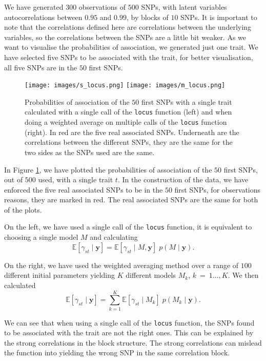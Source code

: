 \documentclass[a4paper, 11pt]{report}
\numberwithin{equation}{chapter}
\begin{document}
We have generated $300$ observations of $500$ SNPs, with latent variables autocorrelations between $0.95$ and $0.99$, by blocks of $10$ SNPs. It is important to note that the correlations defined here are correlations between the underlying variables, so the correlations between the SNPs are a little bit weaker. As we want to visualise the probabilities of association, we generated just one trait. We have selected five SNPs to be associated with the trait, for better visualisation, all five SNPs are in the $50$ first SNPs.


\begin{figure}[h]
\texttt{[image: images/s\_locus.png]}
\texttt{[image: images/m\_locus.png]}
\caption{\label{fig:simple_locus}Probabilities of association of the $50$ first SNPs with a single trait calculated with a single call of the \texttt{locus} function (left) and when doing a weighted average on multiple calls of the \texttt{locus} function (right). In red are the five real associated SNPs. Underneath are the correlations between the different SNPs, they are the same for the two sides as the SNPs used are the same.}
\end{figure}

In Figure \ref{fig:simple_locus}, we have plotted the probabilities of association of the $50$ first SNPs, out of $500$ used, with a single trait $t$. In the construction of the data, we have enforced the five real associated SNPs to be in the $50$ first SNPs, for observations reasons, they are marked in red. The real associated SNPs are the same for both of the plots.

On the left, we have used a single call of the \texttt{locus} function, it is equivalent to choosing a single model $M$ and calculating
\begin{equation*}
\mathbb{E}\left[\gamma_{st}\mid\boldsymbol{y}\right] = \mathbb{E}\left[\gamma_{st}\mid M,\boldsymbol{y}\right]\;p\left(M\mid\boldsymbol{y}\right).
\end{equation*}

On the right, we have used the weighted averaging method over a range of $100$ different initial parameters yielding $K$ different models $ M_k$, $k~=~1\ldots,K$. We then calculated
\begin{equation*}
\mathbb{E}\left[\gamma_{st}\mid\boldsymbol{y}\right] = \sum_{k=1}^K\mathbb{E}\left[\gamma_{st}\mid M_k\right]\;p\left(M_k\mid\boldsymbol{y}\right).
\end{equation*}

We can see that when using a single call of the \texttt{locus} function, the SNPs found to be associated with the trait are not the right ones. This can be explained by the strong correlations in the block structure. The strong correlations can mislead the function into yielding the wrong SNP in the same correlation block.
\end{document}

